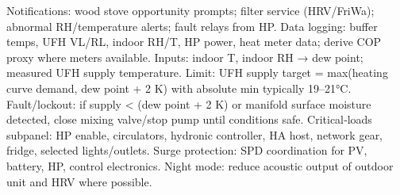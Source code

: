 \markdownRendererUlItem Notifications: wood stove opportunity prompts; filter service (HRV/FriWa); abnormal RH/temperature alerts; fault relays from HP.\markdownRendererUlItemEnd 
\markdownRendererUlItem Data logging: buffer temps, UFH VL/RL, indoor RH/T, HP power, heat meter data; derive COP proxy where meters available.\markdownRendererUlItemEnd 
\markdownRendererUlEndTight \markdownRendererInterblockSeparator
{}
\markdownRendererSectionEnd \markdownRendererSectionBegin
{}\markdownRendererInterblockSeparator
{}\markdownRendererUlBeginTight
\markdownRendererUlItem Inputs: indoor T, indoor RH → dew point; measured UFH supply temperature.\markdownRendererUlItemEnd 
\markdownRendererUlItem Limit: UFH supply target = max(heating curve demand, dew point + 2 K) with absolute min typically 19–21°C.\markdownRendererUlItemEnd 
\markdownRendererUlItem Fault/lockout: if supply < (dew point + 2 K) or manifold surface moisture detected, close mixing valve/stop pump until conditions safe.\markdownRendererUlItemEnd 
\markdownRendererUlEndTight \markdownRendererInterblockSeparator
{}
\markdownRendererSectionEnd \markdownRendererSectionBegin
{}\markdownRendererInterblockSeparator
{}\markdownRendererUlBeginTight
\markdownRendererUlItem Critical‑loads subpanel: HP enable, circulators, hydronic controller, HA host, network gear, fridge, selected lights/outlets.\markdownRendererUlItemEnd 
\markdownRendererUlItem Surge protection: SPD coordination for PV, battery, HP, control electronics.\markdownRendererUlItemEnd 
\markdownRendererUlItem Night mode: reduce acoustic output of outdoor unit and HRV where possible.\markdownRendererUlItemEnd 
\markdownRendererUlEndTight 
\markdownRendererSectionEnd 
\markdownRendererSectionEnd \markdownRendererDocumentEnd